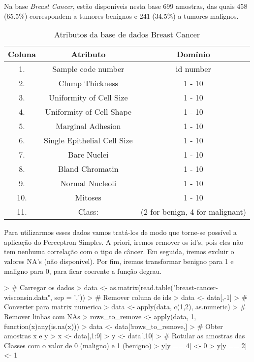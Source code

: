 \documentclass[12pt]{article}
\begin{document}
\par Na base \textit{Breast Cancer}, estão disponíveis nesta base 699 amostras, das quais 458 (65.5\%) correspondem a tumores benignos e 241 (34.5\%) a tumores malignos.
\begin{table}[!h]
        \centering
        \begin{tabular}{|c|c|c|}
            \hline
            Coluna & Atributo & Domínio \\
            \hline
             1. & Sample code number       &     id number \\
            \hline
            2. & Clump Thickness          &     1 - 10\\
             \hline
            3. & Uniformity of Cell Size    &   1 - 10\\
             \hline
            4. & Uniformity of Cell Shape    &  1 - 10\\
             \hline
            5. & Marginal Adhesion           &  1 - 10\\
             \hline
            6. & Single Epithelial Cell Size &  1 - 10\\
             \hline
            7. & Bare Nuclei                 &  1 - 10\\
             \hline
            8. & Bland Chromatin            &   1 - 10\\
             \hline
            9. & Normal Nucleoli            &   1 - 10\\
             \hline
           10. & Mitoses                   &    1 - 10\\
            \hline
           11. & Class:                   &     (2 for benign, 4 for malignant)\\
        	\hline 
    	\end{tabular} 
        \caption{Atributos da base de dados Breast Cancer}
        \label{tab:breastcancer}
\end{table}

\par Para utilizarmos esses dados vamos tratá-los de modo que torne-se possível a aplicação do Perceptron Simples. A priori, iremos remover os id's, pois eles não tem nenhuma correlação com o tipo de câncer. Em seguida, iremos excluir o valores NA's (não disponível). Por fim, iremos transformar benigno para 1 e maligno para 0, para ficar coerente a função degrau.

\begin{Schunk}
\begin{Sinput}
> # Carregar os dados
> data <- as.matrix(read.table("breast-cancer-wisconsin.data", sep = ','))
> # Remover coluna de ids
> data <- data[,-1]
> # Converter para matrix numerica
> data <- apply(data, c(1,2), as.numeric)
> # Remover linhas com NAs
> rows_to_remove <- apply(data, 1, function(x){any(is.na(x))})
> data <- data[!rows_to_remove,]
> # Obter amostras x e y
> x <- data[,1:9]
> y <- data[,10]
> # Rotular as amostras das Classes com o valor de 0 (maligno) e 1 (benigno)
> y[y == 4] <- 0
> y[y == 2] <- 1
\end{Sinput}
\end{Schunk}
\end{document}
